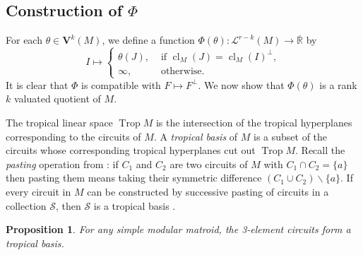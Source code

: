 \documentclass{article}
\newtheorem{proposition}[theorem]{Proposition}
\theoremstyle{definition}
\newcommand{\Rbar}{\overline{\mathbb{R}}}
\newcommand{\cl}{\operatorname{cl}}
\newcommand{\Trop}{\operatorname{Trop}}
\newcommand{\cS}{\mathcal{S}}
\newcommand{\cLL}{\mathcal{L}}
\newcommand{\bV}{\mathbf V}
\begin{document}
     



\subsection{Construction of \texorpdfstring{$\Phi$}{Phi}}
 
For each $\theta\in \bV^k(M)$, we define a function $\Phi(\theta) \colon \cLL^{r-k}(M) \to \Rbar$ by 
\[I\mapsto \begin{cases}
    \theta(J), & \text{ if }\cl_M(J)=\cl_M(I)^\perp,\\
    \infty, & \text{ otherwise}.
\end{cases}\]
It is clear that $\Phi$ is compatible with $F \mapsto F^\perp$.  We now show that $\Phi(\theta)$ is a rank $k$ valuated quotient of $M$.



\noindent 

The tropical linear space $\Trop M$ is the intersection of the tropical hyperplanes corresponding to the circuits of $M$. A \textit{tropical basis} of $M$ is a subset of the circuits whose corresponding tropical hyperplanes cut out $\Trop M$. Recall the \textit{pasting} operation from \cite{yu2006representing}: if $C_1$ and $C_2$ are two circuits of $M$ with $C_1\cap C_2=\{a\}$ then pasting them means taking their symmetric difference $(C_1\cup C_2)\smallsetminus\{a\}$. If every circuit in $M$ can be constructed by successive pasting of circuits in a collection $\cS$, then $\cS$ is a tropical basis \cite[Lemma 4]{yu2006representing}. 

\begin{proposition}\label{prop:modular-tropical-basis}
    For any simple modular matroid, the 3-element circuits form a tropical basis.
\end{proposition}
\end{document}

